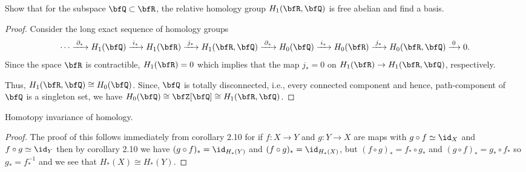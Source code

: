 \begin{problem}[Hatcher {\S}2.1, Ex.\,18]
Show that for the subspace $\bfQ\subset\bfR$, the relative homology group
$H_1(\bfR,\bfQ)$ is free abelian and find a basis.
\end{problem}
\begin{proof}
Consider the long exact sequence of homology groups
\begin{equation}
  \label{eq:relative-short-exact-sequence-3}
\cdots\xrightarrow{\;\partial_*\;}
H_1(\bfQ)\xrightarrow{\;i_*\;}
H_1(\bfR)\xrightarrow{\;j_*\;}
H_1(\bfR,\bfQ)\xrightarrow{\;\partial_*\;}
H_0(\bfQ)\xrightarrow{\;i_*\;}
H_0(\bfR)\xrightarrow{\;j_*\;}
H_0(\bfR,\bfQ)\xrightarrow{\;0\;}0.
\end{equation}
Since the space $\bfR$ is contractible, $H_1(\bfR)=0$ which implies that
the map $j_*=0$ on $H_1(\bfR)\to H_1(\bfR,\bfQ)$, respectively.

Thus,
$H_1(\bfR,\bfQ)\cong H_0(\bfQ)$. Since, $\bfQ$ is totally disconnected,
i.e., every connected component and hence, path-component of $\bfQ$ is a
singleton set, we have $H_0(\bfQ)\cong \bfZ[\bfQ]\cong H_1(\bfR,\bfQ)$.
\end{proof}

\newpage
\begin{problem}
Homotopy invariance of homology.
\end{problem}
\begin{proof}
The proof of this follows immediately from corollary 2.10 for if $f\colon
X\to Y$ and $g\colon Y\to X$ are maps with $g\circ f\simeq\id_X$ and
$f\circ g\simeq \id_Y$ then by corollary 2.10 we have $(g\circ
f)_*=\id_{H_*(Y)}$ and $(f\circ g)_*=\id_{H_*(X)}$, but $(f\circ
g)_*=f_*\circ g_*$ and $(g\circ f)_*=g_*\circ f_*$ so $g_*=f_*^{-1}$ and we
see that $H_*(X)\cong H_*(Y)$.
\end{proof}

